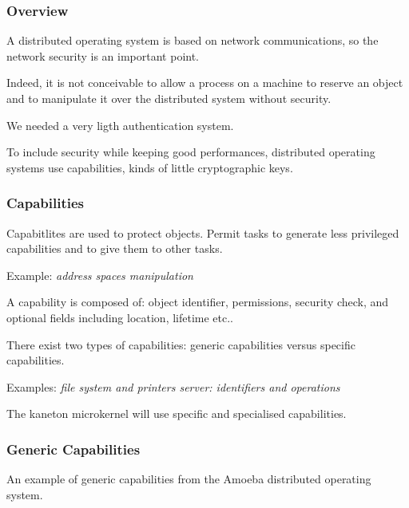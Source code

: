 \begin{frame}
  \frametitle{Overview}

  A distributed operating system is based on network communications, so
  the network security is an important point.

  \nl

  Indeed, it is not conceivable to allow a process on a machine
  to reserve an object and to manipulate it over the distributed
  system without security.

  \nl

  We needed a very ligth authentication system.

  \nl

  To include security while keeping good performances, distributed
  operating systems use capabilities, kinds of little cryptographic keys.
\end{frame}


\begin{frame}
  \frametitle{Capabilities}

  Capabitlites are used to protect objects. Permit tasks to generate
  less privileged capabilities and to give them to other tasks.

  \nl

  Example: \textit{address spaces manipulation}

  \nl

  A capability is composed of: object identifier, permissions,
  security check, and optional fields including location, lifetime
  etc..

  \nl

  There exist two types of capabilities: generic capabilities versus
  \alert{specific} capabilities.

  \nl

  Examples: \textit{file system and printers server: identifiers
    and operations}

  \nl

  The kaneton microkernel will use specific and specialised capabilities.
\end{frame}


\begin{frame}
  \frametitle{Generic Capabilities}

  An example of generic capabilities from the Amoeba distributed operating
  system.

  \begin{center}
  \end{center}
\end{frame}

